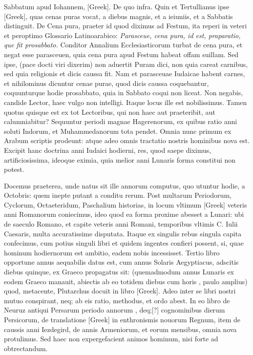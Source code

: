 Sabbatum apud Iohannem, \textgreek{[Greek]}.
De quo infra.
Quin et Tertullianus ipse \textgreek{[Greek]},
quas cenas puras vocat, a diebus magnis, et a ieiuniis, et a
Sabbatis distinguit.
De Cena pura, praeter id quod diximus ad
Festum, ita reperi in veteri et peroptimo Glossario Latinoarabico:
\textit{Parasceue, cena pura, id est, praparatio, que fit prosabbato.}
Conditor Annalium Ecclesiasticorum turbat de cena
pura, et negat esse parasceuen, quia cena pura apud Festum
habeat offam suillam.
Sed ipse, (pace docti viri dixerim) non
aduertit Puram dici, non quia careat carnibus, sed quia religionis
et dicis caussa fit.
Nam et parasceuae Iudaicae habent carnes,
et nihilominus dicuntur cenae purae, quod dicis caussa coquebantur,
coquunturque hodie prosabbato, quia in Sabbato
coqui non liceat.
Non negabis, candide Lector, haec vulgo non intelligi.
Itaque locus ille est nobilissimus. 
Tamen quotus quisque est ex tot Lectoribus, qui non haec
 aut praeteribit,
aut calumniabitur?
Sequuntur periodi magnae Hagerenorum,
ex quibus ratio anni soluti Indorum, et Muhammedanorum
tota pendet.
Omnia nunc primum ex Arabum scriptis
prodeunt: atque adeo omnis tractatio nostris hominibus
nova est.
Excipit hanc doctrina anni Iudaici hodierni, res, quod
saepe diximus, artificiosissima, ideoque eximia, quia melior
anni Lunaris forma constitui non potest.

Docemus praeterea, unde
natus sit ille annorum computus, quo utuntur hodie, a  Octobris:
quem inepte putant a conditu rerum.
Post multarum Periodorum,
Cyclorum, Octaeteridum, Paschalium historias, in locum vltimum
\textgreek{[Greek]} veteris anni Romanorum coniecimus, ideo
quod ea forma proxime abesset a Lunari: ubi de saeculo Romano,
et capite veteris anni Romani, temporibus vltimis C. Iulii Caesaris,
multa accuratissime disputata.
Itaque ex singulis rebus singula capita
confecimus, cum potius singuli libri et quidem ingentes confieri
possent, si, quae hominum hodiernorum est ambitio, eadem nobis
incessisset.
Tertio libro opportune annus aequabilis datus est,
cum annus Solaris Aegyptiacus, adscitis diebus quinque, ex Graeco
propagatus sit: (quemadmodum annus Lunaris ex eodem Graeco
manauit, abiectis ab eo totidem diebus cum horis , paulo amplius)
quod, metacente, Plutarchus docuit in libro \textgreek{[Greek]}.
Adeo inter se libri nostri mutuo conspirant, neq; ab eis ratio,
methodus, et ordo abest.
In eo libro de Neuruz antiqui Persarum
periodo annorum , deq;[?] cognominibus dierum Persicorum,
de translatione \textgreek{[Greek]} in enthronismis nouorum Regnum,
item de caussis anni Iezdegird, de annis Armeniorum, et eorum
mensibus, omnia nova protulimus. 
Sed haec non expergefacient animos
hominum, nisi forte ad obtrectandum.

